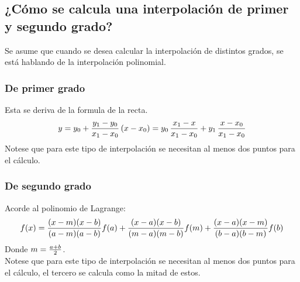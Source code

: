 \documentclass[letterpaper, 12pt]{article}
\begin{document}
\subsection*{¿Cómo se calcula una interpolación de primer y segundo grado?}
\justify
Se asume que cuando se desea calcular la interpolación de distintos grados, se está hablando de la interpolación polinomial.
\subsubsection*{De primer grado}
\justify
Esta se deriva de la formula de la recta.
{\large\[y=y_0+{y_1 - y_0\over x_1-x_0}\,(x-x_0)=y_0\,{x_1-x\over x_1-x_0}+y_1\,{x-x_0\over x_1-x_0}\]}
\justify
Notese que para este tipo de interpolación se necesitan al menos dos puntos para el cálculo.
\subsubsection*{De segundo grado}
\justify
Acorde al polinomio de Lagrange:
{\large \[f(x)={(x-m)(x-b)\over (a-m)(a-b)}f(a)+{(x-a)(x-b)\over (m-a)(m-b)}f(m)+{(x-a)(x-m)\over (b-a)(b-m)}f(b)\]}
\justify
Donde \(m={a+b\over 2}\).
\\\newline
Notese que para este tipo de interpolación se necesitan al menos dos puntos para el cálculo, el tercero se calcula como la mitad de estos.
\end{document}
